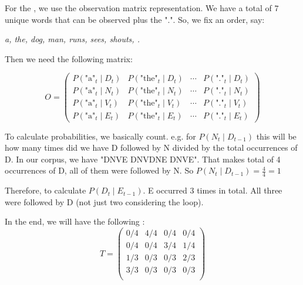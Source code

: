 For the , we use the observation matrix representation. We have a total of $7$ unique words that can be observed plus the ".". So, we fix an order, say:
\begin{center}
    \textit{a, the, dog, man, runs, sees, shouts, .}
\end{center}

Then we need the following matrix:

\[
O =
\begin{pmatrix}
P(\text{"a"}_t \mid D_t) & P(\text{"the"}_t \mid D_t) & \cdots & P(\text{"."}_t \mid D_t) \\ 

P(\text{"a"}_t \mid N_t) & P(\text{"the"}_t \mid N_t) & \cdots & P(\text{"."}_t \mid N_t) \\ 

P(\text{"a"}_t \mid V_t) & P(\text{"the"}_t \mid V_t) & \cdots & P(\text{"."}_t \mid V_t) \\ 

P(\text{"a"}_t \mid E_t) & P(\text{"the"}_t \mid E_t) & \cdots  & P(\text{"."}_t \mid E_t) 
\end{pmatrix}
\] 

To calculate probabilities, we basically count. e.g. for $P(N_t \mid D_{t-1})$ this will be how many times did we have D followed by N divided by the total occurrences of D. In our corpus, we have "DNVE DNVDNE DNVE". That makes total of 4 occurrences of D, all of them were followed by N. So $P(N_t \mid D_{t-1}) = \frac{4}{4} = 1$


Therefore, to calculate $P(D_t \mid E_{t-1})$. E occurred 3 times in total. All three were followed by D (not just two considering the loop).

In the end, we will have the following :
\[
T =
\begin{pmatrix}
0/4 & 4/4 & 0/4 & 0/4\\
0/4 & 0/4 & 3/4 & 1/4 \\
1/3 & 0/3 & 0/3 & 2/3 \\
3/3 & 0/3 & 0/3 & 0/3 \\
\end{pmatrix}
\] 

